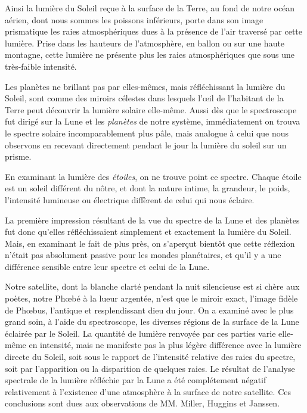 \documentclass[a4paper, 11pt, oneside, landscape]{article}
\begin{document}
Ainsi la lumière du Soleil reçue à la surface de la Terre, au fond de notre océan aérien, dont nous sommes les poissons inférieurs, porte dans son image prismatique les raies atmosphériques dues à la présence de l'air traversé par cette lumière. Prise dans les hauteurs de l'atmosphère, en ballon ou sur une haute montagne, cette lumière ne présente plus les raies atmosphériques que sous une très-faible intensité.

Les planètes ne brillant pas par elles-mêmes, mais réfléchissant la lumière du Soleil, sont comme des miroirs célestes dans lesquels l'œil de l'habitant de la Terre peut découvrir la lumière solaire elle-même. Aussi dès que le spectroscope fut dirigé sur la Lune et les \emph{planètes} de notre système, immédiatement on trouva le spectre solaire incomparablement plus pâle, mais analogue à celui que nous observons en recevant directement pendant le jour la lumière du soleil sur un prisme.

En examinant la lumière des \emph{étoiles}, on ne trouve point ce spectre. Chaque étoile est un soleil différent du nôtre, et dont la nature intime, la grandeur, le poids, l'intensité lumineuse ou électrique diffèrent de celui qui nous éclaire.

La première impression résultant de la vue du spectre de la Lune et des planètes fut donc qu'elles réfléchissaient simplement et exactement la lumière du Soleil. Mais, en examinant le fait de plus près, on s'aperçut bientôt que cette réflexion n'était pas absolument passive pour les mondes planétaires, et qu'il y a une différence sensible entre leur spectre et celui de la Lune.

Notre satellite, dont la blanche clarté pendant la nuit silencieuse est si chère aux poètes, notre Phœbé à la lueur argentée, n'est que le miroir exact, l'image fidèle de Phœbus, l'antique et resplendissant dieu du jour. On a examiné avec le plus grand soin, à l'aide du spectroscope, les diverses régions de la surface de la Lune éclairée par le Soleil. La quantité de lumière renvoyée par ces parties varie elle-même en intensité, mais ne manifeste pas la plus légère différence avec la lumière directe du Soleil, soit sous le rapport de l'intensité relative des raies du spectre, soit par l'apparition ou la disparition de quelques raies. Le résultat de l'analyse spectrale de la lumière réfléchie par la Lune a été complétement négatif relativement à l'existence d'une atmosphère à la surface de notre satellite. Ces conclusions sont dues aux observations de MM. Miller, Huggins et Janssen.
\end{document}
